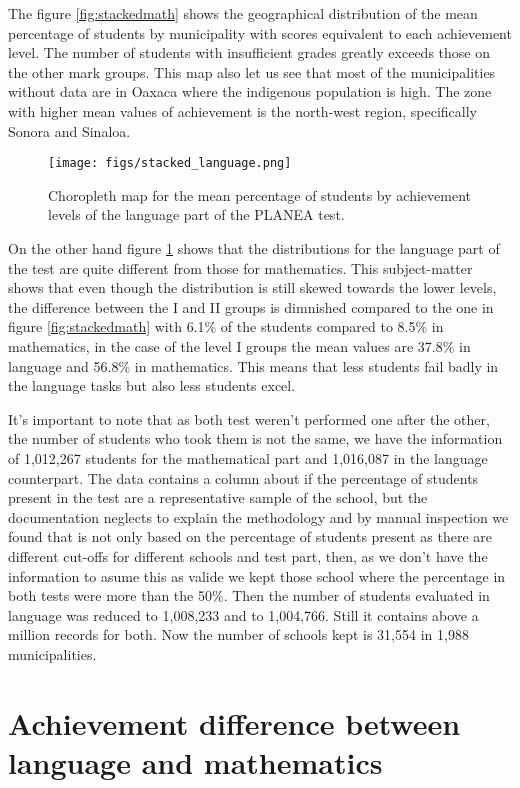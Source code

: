 \documentclass[9pt,twocolumn,twoside,]{pnas-new}
\begin{document}
The figure \ref{fig:stackedmath} shows the geographical distribution of
the mean percentage of students by municipality with scores equivalent
to each achievement level. The number of students with insufficient
grades greatly exceeds those on the other mark groups. This map also let
us see that most of the municipalities without data are in Oaxaca where
the indigenous population is high. The zone with higher mean values of
achievement is the north-west region, specifically Sonora and Sinaloa.

\begin{figure}[H]
\centering
\texttt{[image: figs/stacked\_language.png]}
\caption{Choropleth map for the mean percentage of students by achievement levels of the language part of the PLANEA test.}
\label{fig:stackedlan}
\end{figure}

On the other hand figure \ref{fig:stackedlan} shows that the
distributions for the language part of the test are quite different from
those for mathematics. This subject-matter shows that even though the
distribution is still skewed towards the lower levels, the difference
between the I and II groups is dimnished compared to the one in figure
\ref{fig:stackedmath} with 6.1\% of the students compared to 8.5\% in
mathematics, in the case of the level I groups the mean values are
37.8\% in language and 56.8\% in mathematics. This means that less
students fail badly in the language tasks but also less students excel.

It's important to note that as both test weren't performed one after the
other, the number of students who took them is not the same, we have the
information of 1,012,267 students for the mathematical part and
1,016,087 in the language counterpart. The data contains a column about
if the percentage of students present in the test are a representative
sample of the school, but the documentation neglects to explain the
methodology and by manual inspection we found that is not only based on
the percentage of students present as there are different cut-offs for
different schools and test part, then, as we don't have the information
to asume this as valide we kept those school where the percentage in
both tests were more than the 50\%. Then the number of students
evaluated in language was reduced to 1,008,233 and to 1,004,766. Still
it contains above a million records for both. Now the number of schools
kept is 31,554 in 1,988 municipalities.

\hypertarget{achievement-difference-between-language-and-mathematics}{%
\section*{Achievement difference between language and
mathematics}\label{achievement-difference-between-language-and-mathematics}}
\end{document}
